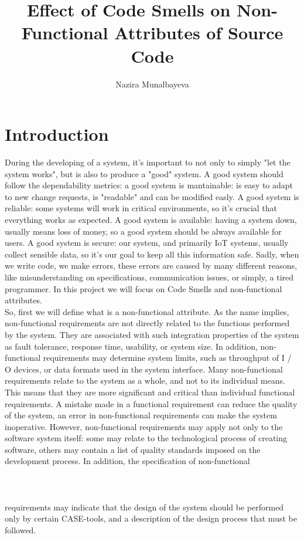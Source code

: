 \documentclass[]{article}
\title{Effect of Code Smells on Non-Functional Attributes of Source Code}
\author{Nazira Munalbayeva}
\begin{document}
\maketitle

\section{Introduction}
During the developing of a system, it's important to not only to simply "let the system works", but is also
to produce a "good" system. A good system should follow the dependability metrics: a good system is mantainable: is easy to adapt to new change requests, is "readable" and can be modified easly. A good system is reliable: some systems will work in critical environments, so it's crucial that everything works as expected. A good system is available: having a system down, usually means loss of money, so a good system should be always available for users. A good system is secure: our system, and primarily IoT systems, usually collect sensible data, so it's our goal to keep all this information safe. Sadly, when we write code, we make errors, these errors are caused by many different reasons, like misunderstanding on specifications, communication issues, or simply, a tired programmer. In this project we will focus on Code Smells and non-functional attributes. \\

So, first we will define what is a non-functional attribute. As the name implies, non-functional requirements are not directly related to the functions performed by the system. They are associated with such integration properties of the system as fault tolerance, response time, usability, or system size. In addition, non-functional requirements may determine system limits, such as throughput of I / O devices, or data formats used in the system interface. Many non-functional requirements relate to the system as a whole, and not to its individual means. This means that they are more significant and critical than individual functional requirements. A mistake made in a functional requirement can reduce the quality of the system, an error in non-functional requirements can make the system inoperative. However, non-functional requirements may apply not only to the software system itself: some may relate to the technological process of creating software, others may contain a list of quality standards imposed on the development process. In addition, the specification of non-functional\\
\\
\\\\
requirements may indicate that the design of the system should be performed only by certain CASE-tools, and a description of the design process that must be followed.
\end{document}
